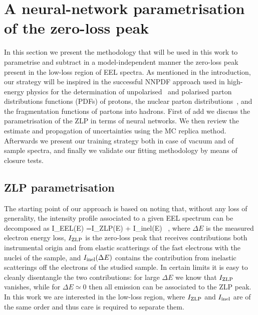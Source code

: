 \section{A neural-network parametrisation of the zero-loss peak}
\label{sec:methodology}

In this section we present the methodology that will be
used in this work to parametrise and subtract in a model-independent manner
the zero-loss peak present in the low-loss region of EEL spectra.
%
As mentioned in the introduction, our strategy will be inspired in the successful
NNPDF approach used in high-energy physics for the determination of
unpolarised~\cite{Ball:2008by,Ball:2012cx,Ball:2014uwa,Ball:2017nwa}
and polarised parton distributions functions (PDFs) of protons, the nuclear
parton distributions~\cite{AbdulKhalek:2020yuc}, and the fragmentation functions of partons into hadrons.
%
First of add we discuss the parametrisation of the ZLP in terms of neural networks.
%
We then review the estimate and propagation of uncertainties using the MC replica method.
%
Afterwards we present our training strategy both in case of vacuum and of sample spectra,
and finally we validate our fitting methodology by means of closure tests.

\subsection{ZLP parametrisation}
\label{sec:parametrisation}

The starting point of our approach is based on noting that, without any loss of generality, the intensity profile
associated to a given EEL spectrum can be decomposed as
\be
I_{\rm EEL}(\Delta E) =I_{\rm ZLP}(\Delta E) + I_{\rm inel}(\Delta E) \, ,
\ee
where $\Delta E$ is the measured electron energy loss, $I_{\rm ZLP}$ is the zero-loss peak that receives
contributions both instrumental origin  and from elastic scatterings of the fast electrons with the
nuclei of the sample, and  $I_{\rm inel}(\Delta E)$ contains the contribution from
inelastic scatterings off the electrons of the studied sample.
%
In certain limits it is easy to cleanly disentangle the two contributions: for large $\Delta E$
we know that $I_{\rm ZLP}$ vanishes, while for $\Delta E\simeq 0$ then all emission can be associated to
 the ZLP peak.
%
In this work we are interested in the low-loss region, where $I_{\rm ZLP}$ and $I_{\rm inel}$
are of the same order and thus  care is required to separate them.

